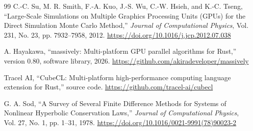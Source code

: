 \documentclass[a4paper,11pt]{article}
\begin{document}
\begin{thebibliography}{99}
C.-C. Su, M. R. Smith, F.-A. Kuo, J.-S. Wu, C.-W. Hsieh, and K.-C. Tseng,
``Large-Scale Simulations on Multiple Graphics Processing Units (GPUs) for the
Direct Simulation Monte Carlo Method,''
\textit{Journal of Computational Physics}, Vol. 231, No. 23, pp. 7932--7958,
2012.
\url{https://doi.org/10.1016/j.jcp.2012.07.038}

A. Hayakawa, ``massively: Multi-platform GPU parallel algorithms for Rust,''
version 0.80, software library, 2026.
\url{https://github.com/akiradeveloper/massively}

Tracel AI, ``CubeCL: Multi-platform high-performance computing language
extension for Rust,'' source code.
\url{https://github.com/tracel-ai/cubecl}

G. A. Sod, ``A Survey of Several Finite Difference Methods for Systems of
Nonlinear Hyperbolic Conservation Laws,''
\textit{Journal of Computational Physics}, Vol. 27, No. 1, pp. 1--31, 1978.
\url{https://doi.org/10.1016/0021-9991(78)90023-2}

\end{thebibliography}
\end{document}
